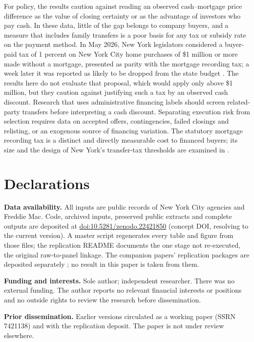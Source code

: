 \documentclass[12pt]{article}
\begin{document}
For policy, the results caution against reading an observed cash--mortgage price difference as the value of closing certainty or as the advantage of investors who pay cash. In these data, little of the gap belongs to company buyers, and a measure that includes family transfers is a poor basis for any tax or subsidy rate on the payment method. In May 2026, New York legislators considered a buyer-paid tax of 1 percent on New York City home purchases of \$1 million or more made without a mortgage, presented as parity with the mortgage recording tax; a week later it was reported as likely to be dropped from the state budget \citep{bloomberg2026cashtax,bloomberg2026cashtaxdropped}. The results here do not evaluate that proposal, which would apply only above \$1 million, but they caution against justifying such a tax by an observed cash discount. Research that uses administrative financing labels should screen related-party transfers before interpreting a cash discount. Separating execution risk from selection requires data on accepted offers, contingencies, failed closings and relisting, or an exogenous source of financing variation. The statutory mortgage recording tax is a distinct and directly measurable cost to financed buyers; its size and the design of New York's transfer-tax thresholds are examined in \citet{loschi2026shape}.

\section*{Declarations}\begingroup\small\singlespacing
\noindent\textbf{Data availability.} All inputs are public records of New York City agencies and Freddie Mac. Code, archived inputs, preserved public extracts and complete outputs are deposited at \href{https://doi.org/10.5281/zenodo.22421850}{doi:10.5281/zenodo.22421850} (concept DOI, resolving to the current version). A master script regenerates every table and figure from those files; the replication README documents the one stage not re-executed, the original raw-to-panel linkage. The companion papers' replication packages are deposited separately \citep{loschi2026shape,loschi2026deed}; no result in this paper is taken from them.

\noindent\textbf{Funding and interests.} Sole author; independent researcher. There was no external funding. The author reports no relevant financial interests or positions and no outside rights to review the research before dissemination.

\noindent\textbf{Prior dissemination.} Earlier versions circulated as a working paper (SSRN 7421138) and with the replication deposit. The paper is not under review elsewhere.
\end{document}
